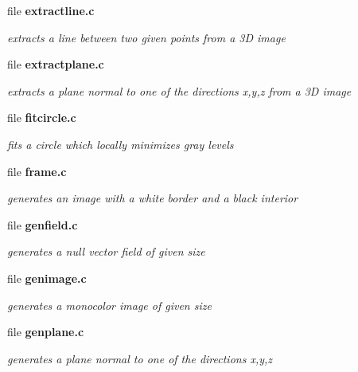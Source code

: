 \begin{CompactItemize}
\item 
file \bf{extractline.c}
\begin{CompactList}\small\item\em extracts a line between two given points from a 3D image \item\end{CompactList}

\item 
file \bf{extractplane.c}
\begin{CompactList}\small\item\em extracts a plane normal to one of the directions x,y,z from a 3D image \item\end{CompactList}

\item 
file \bf{fitcircle.c}
\begin{CompactList}\small\item\em fits a circle which locally minimizes gray levels \item\end{CompactList}

\item 
file \bf{frame.c}
\begin{CompactList}\small\item\em generates an image with a white border and a black interior \item\end{CompactList}

\item 
file \bf{genfield.c}
\begin{CompactList}\small\item\em generates a null vector field of given size \item\end{CompactList}

\item 
file \bf{genimage.c}
\begin{CompactList}\small\item\em generates a monocolor image of given size \item\end{CompactList}

\item 
file \bf{genplane.c}
\begin{CompactList}\small\item\em generates a plane normal to one of the directions x,y,z \item\end{CompactList}


\end{CompactItemize}
